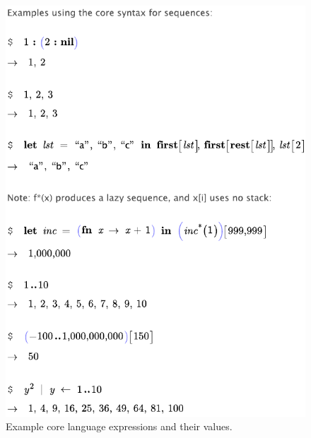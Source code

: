 \begin{figure}	
	\centering

	\includegraphics[scale=0.8]{src/image/core3.pdf}
	
	\caption{Example core language expressions and their values.}
	\label{fig-core}
\end{figure}



